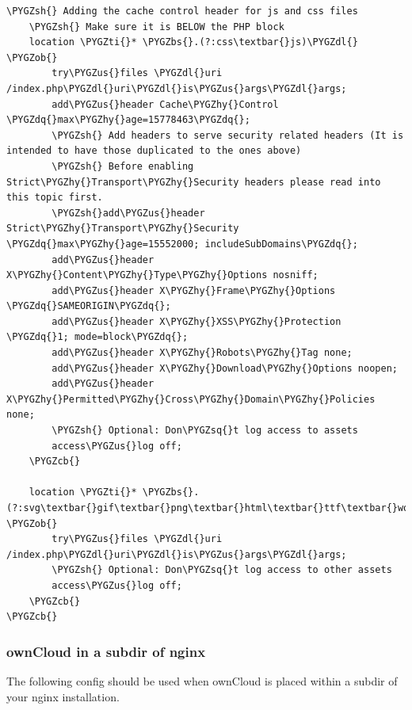 \documentclass[letterpaper,10pt,english]{sphinxmanual}
\def\PYGZbs{\char`\\}
\def\PYGZus{\char`\_}
\def\PYGZob{\char`\{}
\def\PYGZcb{\char`\}}
\def\PYGZsh{\char`\#}
\def\PYGZdl{\char`\$}
\def\PYGZhy{\char`\-}
\def\PYGZsq{\char`\'}
\def\PYGZdq{\char`\"}
\def\PYGZti{\char`\~}
\begin{document}
\begin{Verbatim}[commandchars=\\\{\}]
    \PYGZsh{} Adding the cache control header for js and css files
    \PYGZsh{} Make sure it is BELOW the PHP block
    location \PYGZti{}* \PYGZbs{}.(?:css\textbar{}js)\PYGZdl{} \PYGZob{}
        try\PYGZus{}files \PYGZdl{}uri /index.php\PYGZdl{}uri\PYGZdl{}is\PYGZus{}args\PYGZdl{}args;
        add\PYGZus{}header Cache\PYGZhy{}Control \PYGZdq{}max\PYGZhy{}age=15778463\PYGZdq{};
        \PYGZsh{} Add headers to serve security related headers (It is intended to have those duplicated to the ones above)
        \PYGZsh{} Before enabling Strict\PYGZhy{}Transport\PYGZhy{}Security headers please read into this topic first.
        \PYGZsh{}add\PYGZus{}header Strict\PYGZhy{}Transport\PYGZhy{}Security \PYGZdq{}max\PYGZhy{}age=15552000; includeSubDomains\PYGZdq{};
        add\PYGZus{}header X\PYGZhy{}Content\PYGZhy{}Type\PYGZhy{}Options nosniff;
        add\PYGZus{}header X\PYGZhy{}Frame\PYGZhy{}Options \PYGZdq{}SAMEORIGIN\PYGZdq{};
        add\PYGZus{}header X\PYGZhy{}XSS\PYGZhy{}Protection \PYGZdq{}1; mode=block\PYGZdq{};
        add\PYGZus{}header X\PYGZhy{}Robots\PYGZhy{}Tag none;
        add\PYGZus{}header X\PYGZhy{}Download\PYGZhy{}Options noopen;
        add\PYGZus{}header X\PYGZhy{}Permitted\PYGZhy{}Cross\PYGZhy{}Domain\PYGZhy{}Policies none;
        \PYGZsh{} Optional: Don\PYGZsq{}t log access to assets
        access\PYGZus{}log off;
    \PYGZcb{}

    location \PYGZti{}* \PYGZbs{}.(?:svg\textbar{}gif\textbar{}png\textbar{}html\textbar{}ttf\textbar{}woff\textbar{}ico\textbar{}jpg\textbar{}jpeg)\PYGZdl{} \PYGZob{}
        try\PYGZus{}files \PYGZdl{}uri /index.php\PYGZdl{}uri\PYGZdl{}is\PYGZus{}args\PYGZdl{}args;
        \PYGZsh{} Optional: Don\PYGZsq{}t log access to other assets
        access\PYGZus{}log off;
    \PYGZcb{}
\PYGZcb{}
\end{Verbatim}


\subsubsection{ownCloud in a subdir of nginx}
\label{installation/nginx_examples:owncloud-in-a-subdir-of-nginx}
The following config should be used when ownCloud is placed within a subdir of
your nginx installation.
\end{document}

